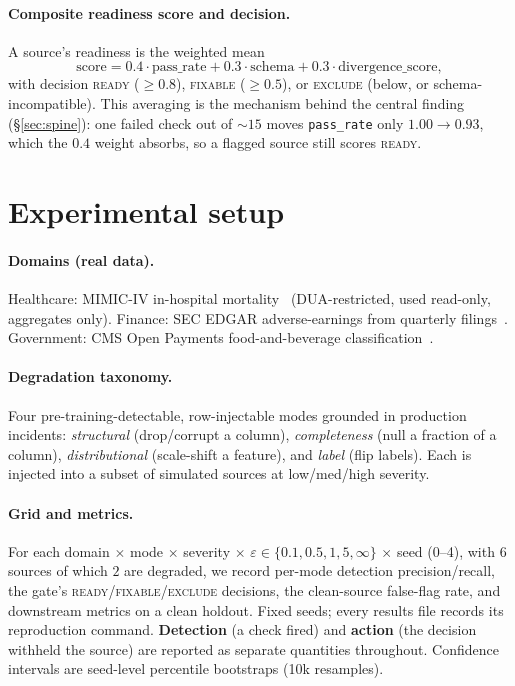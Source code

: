 \documentclass[11pt]{article}
\begin{document}
\paragraph{Composite readiness score and decision.} A source's readiness is the
weighted mean
\[
  \text{score} = 0.4\cdot\text{pass\_rate} + 0.3\cdot\text{schema} + 0.3\cdot\text{divergence\_score},
\]
with decision \textsc{ready} ($\geq 0.8$), \textsc{fixable} ($\geq 0.5$), or
\textsc{exclude} (below, or schema-incompatible). This averaging is the mechanism
behind the central finding (\S\ref{sec:spine}): one failed check out of
${\sim}15$ moves \texttt{pass\_rate} only $1.00\!\to\!0.93$, which the $0.4$ weight
absorbs, so a flagged source still scores \textsc{ready}.

\section{Experimental setup}\label{sec:setup}

\paragraph{Domains (real data).} Healthcare: MIMIC-IV in-hospital
mortality~\citep{mimiciv} (DUA-restricted, used read-only, aggregates only).
Finance: SEC EDGAR adverse-earnings from quarterly
filings~\citep{secedgar}. Government: CMS Open Payments food-and-beverage
classification~\citep{cmsopenpayments}.

\paragraph{Degradation taxonomy.} Four pre-training-detectable, row-injectable
modes grounded in production incidents: \emph{structural} (drop/corrupt a column),
\emph{completeness} (null a fraction of a column), \emph{distributional}
(scale-shift a feature), and \emph{label} (flip labels). Each is injected into a
subset of simulated sources at low/med/high severity.

\paragraph{Grid and metrics.} For each domain $\times$ mode $\times$ severity
$\times$ $\varepsilon\in\{0.1,0.5,1,5,\infty\}$ $\times$ seed (0--4), with
$6$ sources of which $2$ are degraded, we record per-mode detection
precision/recall, the gate's \textsc{ready}/\textsc{fixable}/\textsc{exclude}
decisions, the clean-source false-flag rate, and downstream metrics on a clean
holdout. Fixed seeds; every results file records its reproduction command.
\textbf{Detection} (a check fired) and \textbf{action} (the decision withheld the
source) are reported as separate quantities throughout. Confidence intervals are
seed-level percentile bootstraps (10k resamples).
\end{document}

